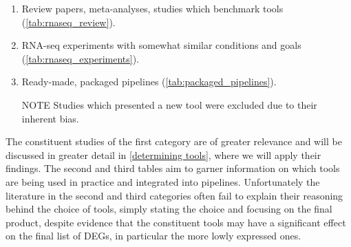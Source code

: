 \begin{enumerate}
\item Review papers, meta-analyses, studies which benchmark tools (\autoref{tab:rnaseq_review}).
\item RNA-seq experiments with somewhat similar conditions and goals (\autoref{tab:rnaseq_experiments}).
\item Ready-made, packaged pipelines (\autoref{tab:packaged_pipelines}).
\item[NOTE] Studies which presented a new tool were excluded due to their inherent bias.
\end{enumerate}

The constituent studies of the first category are of greater relevance and will be discussed in greater detail in \autoref{determining tools}, where we will apply their findings. The second and third tables aim to garner information on which tools are being used in practice and integrated into pipelines. Unfortunately the literature in the second and third categories often fail to explain their reasoning behind the choice of tools, simply stating the choice and focusing on the final product, despite evidence \citep{lin2016comparison, everaert2017benchmarking, williams2017empirical, srivastava2020alignment} that the constituent tools may have a significant effect on the final list of \ac{DEG}s, in particular the more lowly expressed ones. 


